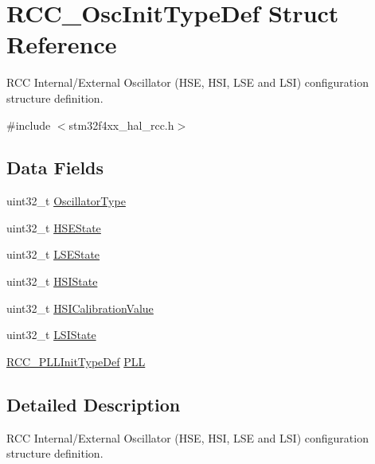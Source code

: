 \hypertarget{struct_r_c_c___osc_init_type_def}{}\section{R\+C\+C\+\_\+\+Osc\+Init\+Type\+Def Struct Reference}
\label{struct_r_c_c___osc_init_type_def}


R\+CC Internal/\+External Oscillator (H\+SE, H\+SI, L\+SE and L\+SI) configuration structure definition.  




{\ttfamily \#include $<$stm32f4xx\+\_\+hal\+\_\+rcc.\+h$>$}

\subsection*{Data Fields}
\begin{DoxyCompactItemize}
\item 
uint32\+\_\+t \hyperlink{struct_r_c_c___osc_init_type_def_af9e7bc89cab81c1705d94c74c7a81088}{Oscillator\+Type}
\item 
uint32\+\_\+t \hyperlink{struct_r_c_c___osc_init_type_def_a7e05d6eec98ed8cdaba00ca3d167ff72}{H\+S\+E\+State}
\item 
uint32\+\_\+t \hyperlink{struct_r_c_c___osc_init_type_def_a7c1294e9407e69e80fe034caf35fe7ea}{L\+S\+E\+State}
\item 
uint32\+\_\+t \hyperlink{struct_r_c_c___osc_init_type_def_a39b62cae65fe7a251000354e5bba8cb6}{H\+S\+I\+State}
\item 
uint32\+\_\+t \hyperlink{struct_r_c_c___osc_init_type_def_a9b2e48e452d0c334f2b9473216064560}{H\+S\+I\+Calibration\+Value}
\item 
uint32\+\_\+t \hyperlink{struct_r_c_c___osc_init_type_def_a955de90db8882fde02c4fb59c7c000f0}{L\+S\+I\+State}
\item 
\hyperlink{struct_r_c_c___p_l_l_init_type_def}{R\+C\+C\+\_\+\+P\+L\+L\+Init\+Type\+Def} \hyperlink{struct_r_c_c___osc_init_type_def_af76de5ee86798f0c3a4c83c84dfa58be}{P\+LL}
\end{DoxyCompactItemize}


\subsection{Detailed Description}
R\+CC Internal/\+External Oscillator (H\+SE, H\+SI, L\+SE and L\+SI) configuration structure definition. 

